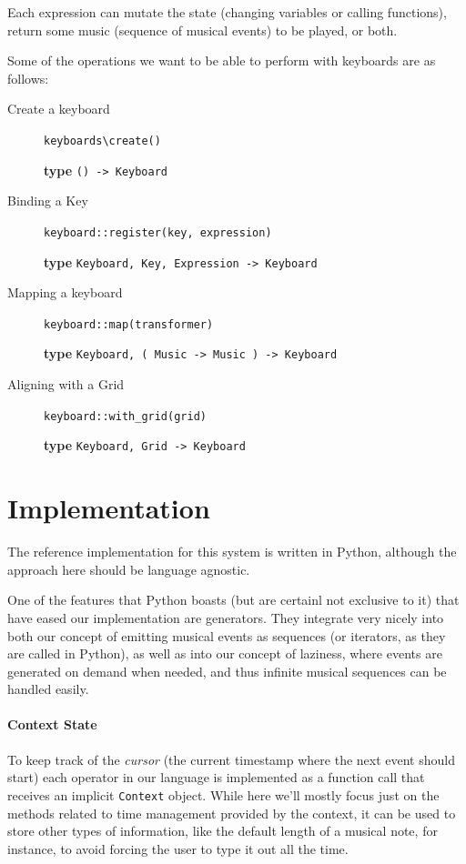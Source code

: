 \documentclass[a4paper,UKenglish,cleveref, autoref]{oasics-v2019}
\begin{document}
Each expression can mutate the state (changing variables or calling functions), return some music (sequence of musical events) to be played, or both.

Some of the operations we want to be able to perform with keyboards are as follows:

\begin{description}
    \item[Create a keyboard] \verb|keyboards\create()|
    
        \textbf{type} \verb|() -> Keyboard|
    \item[Binding a Key] \verb'keyboard::register(key, expression)'
        
        \textbf{type} \verb|Keyboard, Key, Expression -> Keyboard|
    \item[Mapping a keyboard] \verb'keyboard::map(transformer)'
        
        \textbf{type} \verb|Keyboard, ( Music -> Music ) -> Keyboard|
    \item[Aligning with a Grid] \verb'keyboard::with_grid(grid)'
        
        \textbf{type} \verb|Keyboard, Grid -> Keyboard|    
\end{description}


\section{Implementation}
The reference implementation for this system is written in Python, although the approach here should be language agnostic.

One of the features that Python boasts (but are certainl not exclusive to it) that have eased our implementation are generators\cite{PEP255}. They integrate very nicely into both our concept of emitting musical events as sequences (or iterators, as they are called in Python), as well as into our concept of laziness, where events are generated on demand when needed, and thus infinite musical sequences can be handled easily.

\paragraph*{Context State}
To keep track of the \textit{cursor} (the current timestamp where the next event should start) each operator in our language is implemented as a function call that receives an implicit \texttt{Context} object. While here we'll mostly focus just on the methods related to time management provided by the context, it can be used to store other types of information, like the default length of a musical note, for instance, to avoid forcing the user to type it out all the time.
\end{document}
